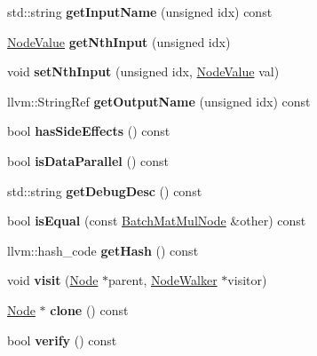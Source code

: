 \begin{DoxyCompactItemize}
std\+::string {\bfseries get\+Input\+Name} (unsigned idx) const
\item 
\mbox{\label{classglow_1_1_batch_mat_mul_node_aa3b136e0b52e33500ce3f49dc1eb5f48}} 
\hyperlink{structglow_1_1_node_value}{Node\+Value} {\bfseries get\+Nth\+Input} (unsigned idx)
\item 
\mbox{\label{classglow_1_1_batch_mat_mul_node_a39013741f26ff2151f8550cc45d89730}} 
void {\bfseries set\+Nth\+Input} (unsigned idx, \hyperlink{structglow_1_1_node_value}{Node\+Value} val)
\item 
\mbox{\label{classglow_1_1_batch_mat_mul_node_a0a6cd964cb962d4376e6701dd55d139a}} 
llvm\+::\+String\+Ref {\bfseries get\+Output\+Name} (unsigned idx) const
\item 
\mbox{\label{classglow_1_1_batch_mat_mul_node_a54ed7074f809ea9402a9a97852b09047}} 
bool {\bfseries has\+Side\+Effects} () const
\item 
\mbox{\label{classglow_1_1_batch_mat_mul_node_a529d20e2a9fefa05a35127c113b79a9c}} 
bool {\bfseries is\+Data\+Parallel} () const
\item 
\mbox{\label{classglow_1_1_batch_mat_mul_node_a2dcc347b7e49472fffb2921542dfcdaa}} 
std\+::string {\bfseries get\+Debug\+Desc} () const
\item 
\mbox{\label{classglow_1_1_batch_mat_mul_node_ae0d7776e362b6854354de6151fbc48cf}} 
bool {\bfseries is\+Equal} (const \hyperlink{classglow_1_1_batch_mat_mul_node}{Batch\+Mat\+Mul\+Node} \&other) const
\item 
\mbox{\label{classglow_1_1_batch_mat_mul_node_aa9b17e3e96e14e2b094d61521b440ae4}} 
llvm\+::hash\+\_\+code {\bfseries get\+Hash} () const
\item 
\mbox{\label{classglow_1_1_batch_mat_mul_node_a154054c8e7ba59bd8ed6b50a05fb9ffc}} 
void {\bfseries visit} (\hyperlink{classglow_1_1_node}{Node} $\ast$parent, \hyperlink{classglow_1_1_node_walker}{Node\+Walker} $\ast$visitor)
\item 
\mbox{\label{classglow_1_1_batch_mat_mul_node_a78d65cb933069680043cd7f872d601eb}} 
\hyperlink{classglow_1_1_node}{Node} $\ast$ {\bfseries clone} () const
\item 
\mbox{\label{classglow_1_1_batch_mat_mul_node_ad5b28d8f6dfa192d43c3064f3f5d2a61}} 
bool {\bfseries verify} () const
\end{DoxyCompactItemize}
